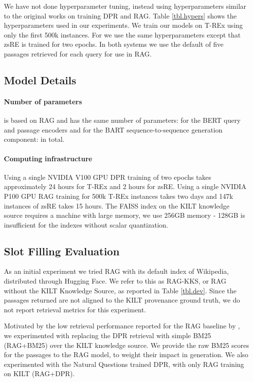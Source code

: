 We have not done hyperparameter tuning, instead using hyperparameters similar to the original works on training DPR and RAG. Table \ref{tbl.hypers} shows the hyperparameters used in our experiments. 
We train our models on T-REx using only the first 500k instances.
For  we use the same hyperparameters except that zsRE is trained for two epochs. In both \kgi{} systems we use the default of five passages retrieved for each query for use in RAG.

\subsection{Model Details}

\paragraph{Number of parameters}
\kgi{} is based on RAG and has the same number of parameters:  for the BERT query and passage encoders and  for the BART sequence-to-sequence generation component:  in total.

\paragraph{Computing infrastructure}
Using a single NVIDIA V100 GPU DPR training of two epochs takes approximately 24 hours for T-REx and 2 hours for zsRE.
Using a single NVIDIA P100 GPU RAG training for 500k T-REx instances takes two days and 147k instances of zsRE takes 15 hours.
The FAISS index on the KILT knowledge source requires a machine with large memory, we use 256GB memory - 128GB is insufficient for the indexes without scalar quantization.

\subsection{Slot Filling Evaluation}

As an initial experiment we tried RAG with its default index of Wikipedia, distributed through Hugging Face. We refer to this as RAG-KKS, or RAG without the KILT Knowledge Source, as reported in Table \ref{tbl.dev}. Since the passages returned are not aligned to the KILT provenance ground truth, we do not report retrieval metrics for this experiment.  

Motivated by the low retrieval performance reported for the RAG baseline by \citet{kilt}, we experimented with replacing the DPR retrieval with simple BM25 (RAG+BM25) over the KILT knowledge source. We provide the raw BM25 scores for the passages to the RAG model, to weight their impact in generation. We also experimented with the Natural Questions trained DPR, with only RAG training on KILT (RAG+DPR). 

